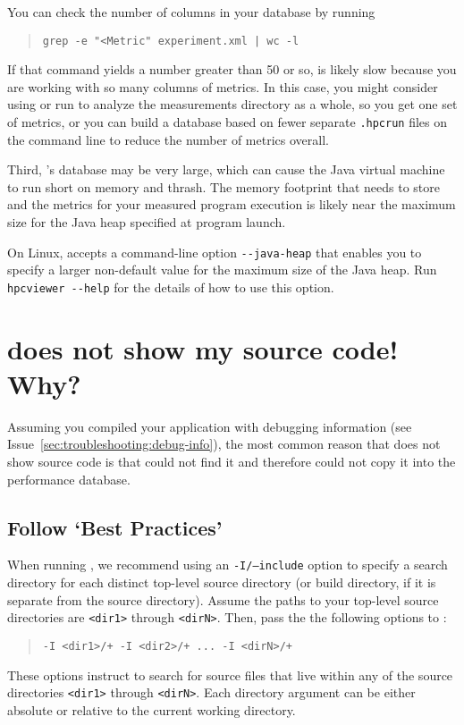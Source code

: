 \documentclass[11pt,letterpaper]{report}
\begin{document}
You can check the number of columns in your database by running
\begin{quote}
  \verb,grep -e "<Metric" experiment.xml | wc -l,
\end{quote}
If that command yields a number greater than 50 or so, \hpcviewer{} is likely slow because you are working with so many columns of metrics. In this case, you might consider using  \hpcprofmpi{} or run \hpcprof{} to analyze the measurements directory as a whole, so you get one set of metrics, or you can build a database based on fewer separate {\tt .hpcrun} files on the command line to reduce the number of metrics overall.

Third, \HPCToolkit{}'s database may be very large, which can cause the Java virtual machine to run short on memory and thrash. The memory footprint that \hpcviewer{} needs to store and the metrics for your measured program execution is likely near the maximum size for the Java heap specified at program launch.

On Linux, \hpcviewer{} accepts a command-line option \verb|--java-heap| that enables you to specify a larger non-default value for the maximum size of the Java heap. Run \verb|hpcviewer --help| for the details of how to use this option.



\section{\hpcviewer{} does not show my source code! Why?}


Assuming you compiled your application with debugging information (see Issue~\ref{sec:troubleshooting:debug-info}), the most common reason that \hpcviewer{} does not show source code is that \hpcprofAll{} could not find it and therefore could not copy it into the \HPCToolkit{} performance database.




\subsection{Follow `Best Practices'}

When running \hpcprofAll{}, we recommend using an \texttt{-I/--include} option to specify a search directory for each distinct top-level source directory (or build directory, if it is separate from the source directory).
Assume the paths to your top-level source directories are \texttt{<dir1>} through \texttt{<dirN>}.
Then, pass the the following options to \hpcprofAll{}:
\begin{quote}
  \verb|-I <dir1>/+ -I <dir2>/+ ... -I <dirN>/+|
\end{quote}
These options instruct \hpcprofAll{} to search for source files that live within any of the source directories \texttt{<dir1>} through \texttt{<dirN>}.
Each directory argument can be either absolute or relative to the current working directory.
\end{document}

